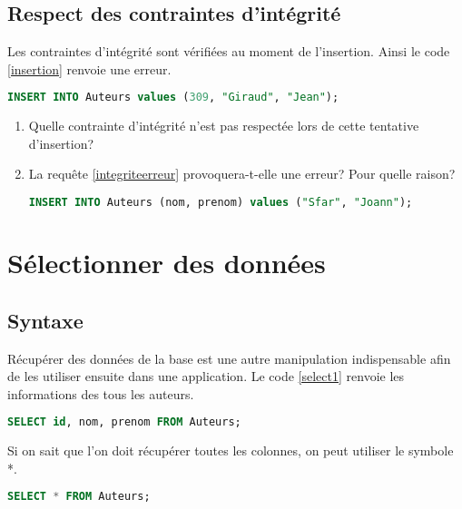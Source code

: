 \documentclass[a4paper,11pt]{article}
\begin{document}
\begin{Form}
\subsection{Respect des contraintes d'intégrité}
Les contraintes d'intégrité sont vérifiées au moment de l'insertion. Ainsi le code \ref{insertion} renvoie une erreur.
\begin{center}
\begin{lstlisting}[language=SQL]
INSERT INTO Auteurs values (309, "Giraud", "Jean");
\end{lstlisting}
\label{insertion}
\end{center}
\begin{activite}
\begin{enumerate}
\item Quelle contrainte d'intégrité n'est pas respectée lors de cette tentative d'insertion?
\item La requête \ref{integriteerreur} provoquera-t-elle une erreur? Pour quelle raison?
\begin{center}
\begin{lstlisting}[language=SQL]
INSERT INTO Auteurs (nom, prenom) values ("Sfar", "Joann");
\end{lstlisting}
\label{integriteerreur}
\end{center}
\end{enumerate}
\end{activite}
\section{Sélectionner des données}
\subsection{Syntaxe}
Récupérer des données de la base est une autre manipulation indispensable afin de les utiliser ensuite dans une application. Le code \ref{select1} renvoie les informations des tous les auteurs.
\begin{center}
\begin{lstlisting}[language=SQL]
SELECT id, nom, prenom FROM Auteurs;
\end{lstlisting}
\label{select1}
\end{center}
Si on sait que l'on doit récupérer toutes les colonnes, on peut utiliser le symbole *.
\begin{center}
\begin{lstlisting}[language=SQL]
SELECT * FROM Auteurs;
\end{lstlisting}
\label{select2}
\end{center}

\end{Form}
\end{document}
